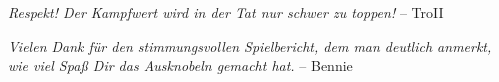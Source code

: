 \documentclass[10pt, a4paper, oneside]{book}
\begin{document}
\begin{chapterbox}
{        %
        \textit{Respekt! Der Kampfwert wird in der Tat nur schwer zu toppen!}
        \newline
        – TroII
        \bigskip

        \textit{Vielen Dank für den stimmungsvollen Spielbericht, dem man deutlich anmerkt, wie viel Spaß Dir das Ausknobeln gemacht hat.}
        \newline
        – Bennie
    }

\end{chapterbox}





\newpage
\end{document}
